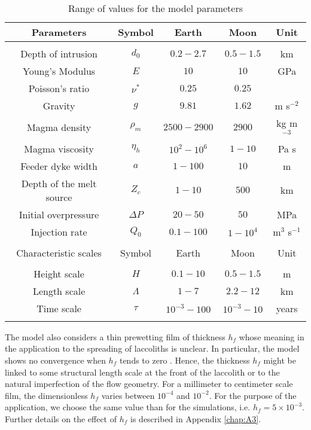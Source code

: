 \begin{table}[h!]
  \caption{Range of values for the model parameters}
  \centering
  \begin{tabular}{c|c|c|c|c}
    Parameters& Symbol & Earth & Moon&Unit\\
    \hline
              &&&&\\
    Depth of intrusion & $d_0$ & $0.2-2.7$ &$0.5-1.5$ &km \\
    Young's Modulus & $E$ & $10$ &$10$ &GPa \\
    Poisson's ratio & $\nu^*$ & $0.25$ &$0.25$ &\\
    Gravity & $g$ & $9.81$ &$1.62$&m s$^{-2}$ \\
    Magma density & $\rho_{m}$ & $2500-2900$ &$2900$&kg m$^{-3}$ \\
    Magma viscosity & $\eta_h $ & $10^2-10^{6}$ &$1-10$&Pa s \\
    Feeder dyke width & $a$ & $1-100$ &$10$&m \\
    Depth of the melt source & $Z_{c}$ & $ 1-10$&$ 500$& km \\ 
    Initial overpressure & $\Delta P$ & $20-50$ &$50$ &MPa \\
    Injection rate & $Q_{0}$ &$0.1-100$ &$1-10^4$&m$^{3}$ s$^{-1}$ \\
              &&&&\\
    \hline
    Characteristic scales & Symbol & Earth & Moon&Unit\\
    \hline
              &&&&\\
    Height scale & $H$& $0.1-10$ &$0.5-1.5$ &m \\
    Length scale & $\Lambda$ & $1-7$&$2.2-12$& km \\
    Time scale & $\tau$ & $10^{-3}-100$&$10^{-3}-10$& years \\
    \label{C2-tab2}
  \end{tabular} 
\end{table}

The model  also considers  a thin prewetting  film of  thickness $h_f$
whose meaning  in the  application to the  spreading of  laccoliths is
unclear.  In  particular, the  model shows  no convergence  when $h_f$
tends to zero \citep{Lister:2013ia}.  Hence, the thickness $h_f$ might
be  linked  to some  structural  length  scale  at  the front  of  the
laccolith or  to the natural  imperfection of the flow  geometry.  For
a millimeter to centimeter scale film, the dimensionless $h_f$ varies
between $10^{-4}$ and  $10^{-2}$. For the purpose  of the application,
we   choose  the   same   value  than   for   the  simulations,   i.e.
$h_f=5\times  10^{-3}$. Further  details  on the  effect  of $h_f$  is
described in Appendix \ref{chap:A3}.

